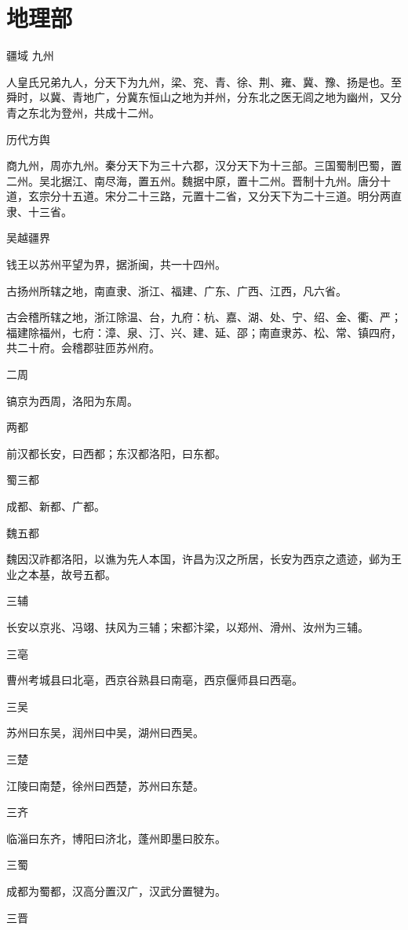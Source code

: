 \documentclass[a4paper,12pt,UTF8,twoside]{ctexbook}
\begin{document}
	\part{地理部}
	疆域
	九州
	
	人皇氏兄弟九人，分天下为九州，梁、兖、青、徐、荆、雍、冀、豫、扬是也。至舜时，以冀、青地广，分冀东恒山之地为并州，分东北之医无闾之地为幽州，又分青之东北为登州，共成十二州。
	
	历代方舆
	
	商九州，周亦九州。秦分天下为三十六郡，汉分天下为十三部。三国蜀制巴蜀，置二州。吴北据江、南尽海，置五州。魏据中原，置十二州。晋制十九州。唐分十道，玄宗分十五道。宋分二十三路，元置十二省，又分天下为二十三道。明分两直隶、十三省。
	
	吴越疆界
	
	钱王以苏州平望为界，据浙闽，共一十四州。
	
	古扬州所辖之地，南直隶、浙江、福建、广东、广西、江西，凡六省。
	
	古会稽所辖之地，浙江除温、台，九府：杭、嘉、湖、处、宁、绍、金、衢、严；福建除福州，七府：漳、泉、汀、兴、建、延、邵；南直隶苏、松、常、镇四府，共二十府。会稽郡驻匝苏州府。
	
	二周
	
	镐京为西周，洛阳为东周。
	
	两都
	
	前汉都长安，曰西都；东汉都洛阳，曰东都。
	
	蜀三都
	
	成都、新都、广都。
	
	魏五都
	
	魏因汉祚都洛阳，以谯为先人本国，许昌为汉之所居，长安为西京之遗迹，邺为王业之本基，故号五都。
	
	三辅
	
	长安以京兆、冯翊、扶风为三辅；宋都汴梁，以郑州、滑州、汝州为三辅。
	
	三亳
	
	曹州考城县曰北亳，西京谷熟县曰南亳，西京偃师县曰西亳。
	
	三吴
	
	苏州曰东吴，润州曰中吴，湖州曰西吴。
	
	三楚
	
	江陵曰南楚，徐州曰西楚，苏州曰东楚。
	
	三齐
	
	临淄曰东齐，博阳曰济北，蓬州即墨曰胶东。
	
	三蜀
	
	成都为蜀都，汉高分置汉广，汉武分置犍为。
	
	三晋
	
\end{document}
